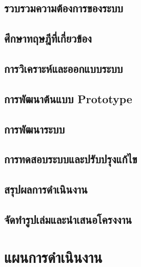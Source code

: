 \hspace{0cm}\subsection{รวบรวมความต้องการของระบบ}

\hspace{0cm}\subsection{ศึกษาทฤษฎีที่เกี่ยวข้อง}

\hspace{0cm}\subsection{การวิเคราะห์และออกแบบระบบ}

\hspace{0cm}\subsection{การพัฒนาต้นแบบ Prototype}

\hspace{0cm}\subsection{การพัฒนาระบบ}

\hspace{0cm}\subsection{การทดสอบระบบและปรับปรุงแก้ไข}

\hspace{0cm}\subsection{สรุปผลการดำเนินงาน}

\hspace{0cm}\subsection{จัดทำรูปเล่มและนำเสนอโครงงาน}

\vspace{2cm}

\hspace{0cm}\section{แผนการดำเนินงาน}

